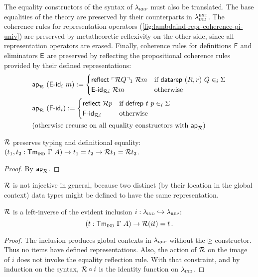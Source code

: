 The equality constructors of the syntax of $\lambda_{\textsc{rep}}$ must also be translated.
The base equalities of the theory are preserved by their counterparts in
$\lambda_{\textsc{ind}}^\textsc{ext}$. The coherence rules for representation operators
(\cref{fig:lambdaind-repr-coherence-pi-univ}) are preserved by metatheoretic
reflexivity on the other side, since all representation operators are erased.
Finally, coherence rules for definitions $\textsf{F}$ and eliminators $\textsf{E}$ are
preserved by reflecting the propositional coherence rules provided by their
defined representations:
\begin{align*}
& \mta{ap}_\R\ (\mta{E-id}_i\ m) :=
\begin{cases}
    \mta{reflect}\ \emb{\R Q}_1\ \R m & \text{if}\ \mta{datarep}\ (R, r)\ Q \in_i \Sigma \\
    \mta{E-id}_{\R i}\ \R m & \text{otherwise}
    \end{cases} \\
    & \mta{ap}_\R\ (\mta{F-id}_i) :=
    \begin{cases}
        \mta{reflect}\ \R p & \text{if}\ \mta{defrep}\ t\ p \in_i \Sigma \\
        \mta{F-id}_{\R i} & \text{otherwise}
        \end{cases} \\
& \text{(otherwise recurse on all equality constructors with $\mta{ap}_\R$)}
\end{align*}

\begin{theorem}
    $\mathcal{R}$ preserves typing and definitional equality: $(t_1, t_2 : \textsf{Tm}_{{\textsc{ind}}}\ \Gamma\ A) \to t_1 = t_2 \to \mathcal{R} t_1 = \mathcal{R} t_2$.
    \begin{proof}
        By $\textsf{ap}_{\mathcal{R}}$.
    \end{proof}
\end{theorem}
$\mathcal{R}$ is not injective in general, because two distinct (by their location in the
global context) data types might be defined to have the same representation.

\begin{theorem}
    $\mathcal{R}$ is a left-inverse of the evident inclusion $i : \lambda_{\textsc{ind}} \hookrightarrow \lambda_{\textsc{rep}}$:
    \[
        (t : \textsf{Tm}_{{\textsc{ind}}}\ \Gamma\ A) \to \mathcal{R}(i t) = t \,.
    \]
    \begin{proof}
        The inclusion produces global contexts in $\lambda_{\textsc{rep}}$ without the $\unrhd$ constructor. Thus no
        items have defined representations. Also, the action of $\mathcal{R}$ on
        the image of $i$ does not invoke the equality reflection rule. With that
        constraint, and by induction on the syntax, $\mathcal{R} \circ i$ is the identity
        function on $\lambda_{\textsc{ind}}$.
    \end{proof}
\end{theorem}


